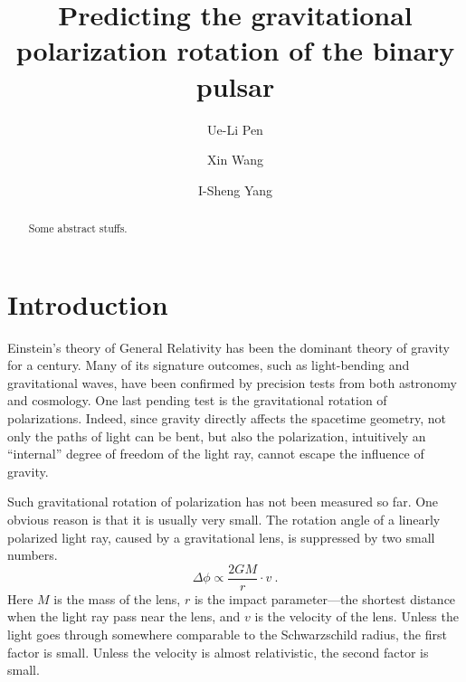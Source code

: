 \documentclass[aps,showpacs,twocolumn,floats,prd,superscriptaddress,nofootinbib]{revtex4}
\begin{document}
\title{Predicting the gravitational polarization rotation of the binary pulsar}

\author{Ue-Li Pen}

\author{Xin Wang}

\author{I-Sheng Yang}

\begin{abstract}
Some abstract stuffs.
\end{abstract}

\maketitle

\section{Introduction}

Einstein's theory of General Relativity has been the dominant theory of gravity for a century. Many of its signature outcomes, such as light-bending and gravitational waves, have been confirmed by precision tests from both astronomy and cosmology. One last pending test is the gravitational rotation of polarizations. Indeed, since gravity directly affects the spacetime geometry, not only the paths of light can be bent, but also the polarization, intuitively an ``internal'' degree of freedom of the light ray, cannot escape the influence of gravity.

Such gravitational rotation of polarization has not been measured so far.  One obvious reason is that it is usually very small. The rotation angle of a linearly polarized light ray, caused by a gravitational lens, is suppressed by two small numbers.
\begin{equation}
\Delta\phi \propto \frac{2GM}{r} \cdot v~.
\label{eq-v}
\end{equation}
Here $M$ is the mass of the lens, $r$ is the impact parameter---the shortest distance when the light ray pass near the lens, and $v$ is the velocity of the lens.  Unless the light goes through somewhere comparable to the Schwarzschild radius, the first factor is small. Unless the velocity is almost relativistic, the second factor is small. 
\end{document}
